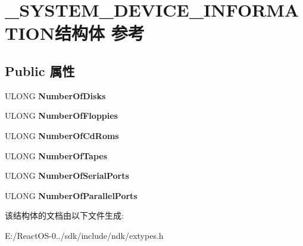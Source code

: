 \hypertarget{struct___s_y_s_t_e_m___d_e_v_i_c_e___i_n_f_o_r_m_a_t_i_o_n}{}\section{\+\_\+\+S\+Y\+S\+T\+E\+M\+\_\+\+D\+E\+V\+I\+C\+E\+\_\+\+I\+N\+F\+O\+R\+M\+A\+T\+I\+O\+N结构体 参考}
\label{struct___s_y_s_t_e_m___d_e_v_i_c_e___i_n_f_o_r_m_a_t_i_o_n}
\subsection*{Public 属性}
\begin{DoxyCompactItemize}
\item 
\mbox{\label{struct___s_y_s_t_e_m___d_e_v_i_c_e___i_n_f_o_r_m_a_t_i_o_n_a110da1dbfd3b14ba0ec2ecef0bc0e317}} 
U\+L\+O\+NG {\bfseries Number\+Of\+Disks}
\item 
\mbox{\label{struct___s_y_s_t_e_m___d_e_v_i_c_e___i_n_f_o_r_m_a_t_i_o_n_ad09660297637819b3e19ebd9a90997b7}} 
U\+L\+O\+NG {\bfseries Number\+Of\+Floppies}
\item 
\mbox{\label{struct___s_y_s_t_e_m___d_e_v_i_c_e___i_n_f_o_r_m_a_t_i_o_n_a7a0f0087a022e2a68609c13b410642bb}} 
U\+L\+O\+NG {\bfseries Number\+Of\+Cd\+Roms}
\item 
\mbox{\label{struct___s_y_s_t_e_m___d_e_v_i_c_e___i_n_f_o_r_m_a_t_i_o_n_a207853efbde8f86a43d2796400b0c40d}} 
U\+L\+O\+NG {\bfseries Number\+Of\+Tapes}
\item 
\mbox{\label{struct___s_y_s_t_e_m___d_e_v_i_c_e___i_n_f_o_r_m_a_t_i_o_n_a5932fb4a6ac366f9c10a2f8e5ff6c70c}} 
U\+L\+O\+NG {\bfseries Number\+Of\+Serial\+Ports}
\item 
\mbox{\label{struct___s_y_s_t_e_m___d_e_v_i_c_e___i_n_f_o_r_m_a_t_i_o_n_a7f33a5bba38f421ee4639bb4772edeb5}} 
U\+L\+O\+NG {\bfseries Number\+Of\+Parallel\+Ports}
\end{DoxyCompactItemize}


该结构体的文档由以下文件生成\+:\begin{DoxyCompactItemize}
\item 
E\+:/\+React\+O\+S-\/0../sdk/include/ndk/extypes.\+h\end{DoxyCompactItemize}
